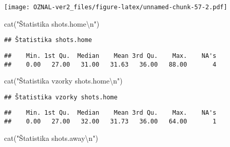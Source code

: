 \documentclass[
]{article}
\newenvironment{Shaded}{\begin{snugshade}}{\end{snugshade}}
\newcommand{\FunctionTok}[1]{\textcolor[rgb]{0.00,0.00,0.00}{#1}}
\newcommand{\NormalTok}[1]{#1}
\newcommand{\SpecialCharTok}[1]{\textcolor[rgb]{0.00,0.00,0.00}{#1}}
\newcommand{\StringTok}[1]{\textcolor[rgb]{0.31,0.60,0.02}{#1}}
\begin{document}
\texttt{[image: OZNAL-ver2\_files/figure-latex/unnamed-chunk-57-2.pdf]}

\begin{Shaded}
\begin{Highlighting}[]
\FunctionTok{cat}\NormalTok{(}\StringTok{"Štatistika shots.home}\SpecialCharTok{\textbackslash{}n}\StringTok{"}\NormalTok{)}
\end{Highlighting}
\end{Shaded}

\begin{verbatim}
## Štatistika shots.home
\end{verbatim}

\begin{Shaded}
\end{Shaded}

\begin{verbatim}
##    Min. 1st Qu.  Median    Mean 3rd Qu.    Max.    NA's 
##    0.00   27.00   31.00   31.63   36.00   88.00       4
\end{verbatim}

\begin{Shaded}
\begin{Highlighting}[]
\FunctionTok{cat}\NormalTok{(}\StringTok{"Štatistika vzorky shots.home}\SpecialCharTok{\textbackslash{}n}\StringTok{"}\NormalTok{)}
\end{Highlighting}
\end{Shaded}

\begin{verbatim}
## Štatistika vzorky shots.home
\end{verbatim}

\begin{Shaded}
\end{Shaded}

\begin{verbatim}
##    Min. 1st Qu.  Median    Mean 3rd Qu.    Max.    NA's 
##    0.00   27.00   32.00   31.73   36.00   64.00       1
\end{verbatim}

\begin{Shaded}
\begin{Highlighting}[]
\FunctionTok{cat}\NormalTok{(}\StringTok{"Štatistika shots.away}\SpecialCharTok{\textbackslash{}n}\StringTok{"}\NormalTok{)}
\end{Highlighting}
\end{Shaded}
\end{document}
